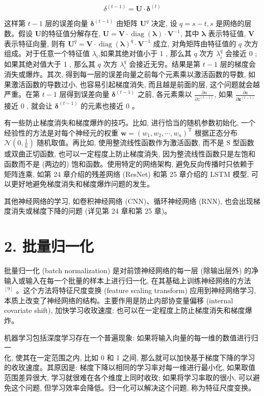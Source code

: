 \documentclass[10pt]{article}
\begin{document}
\begin{CJK*}{UTF8}{bsmi}
$$
\delta^{(t-1)}=\boldsymbol{U} \cdot \boldsymbol{\delta}^{(t)}
$$

这样第 $t-1$ 层的误差向量 $\boldsymbol{\delta}^{(t-1)}$ 由矩阵 $\boldsymbol{U}^{q}$ 决定, 设 $q=s-t, s$ 是网络的层数。假设 $\boldsymbol{U}$的特征值分解存在, $\boldsymbol{U}=\boldsymbol{V} \cdot \operatorname{diag}(\boldsymbol{\lambda}) \cdot \boldsymbol{V}^{-1}$, 其中 $\boldsymbol{\lambda}$ 表示特征值, $\boldsymbol{V}$ 表示特征向量, 则有 $\boldsymbol{U}^{q}=\boldsymbol{V} \cdot \operatorname{diag}(\boldsymbol{\lambda})^{q} \cdot \boldsymbol{V}^{-1}$ 成立, 对角矩阵由特征值的 $q$ 次方组成。对于任意一个特征值 $\lambda_{i}$,如果其绝对值小于 1 , 那么其 $q$ 次方 $\lambda_{i}^{q}$ 会接近 0 ; 如果其绝对值大于 1 , 那么其 $q$ 次方 $\lambda_{i}^{q}$ 会接近无穷。结果是第 $t-1$ 层的梯度会消失或爆炸。其次, 得到每一层的误差向量之前每个元素乘以激活函数的导数, 如果激活函数的导数过小, 也容易引起梯度消失, 而且越是前面的层, 这个问题就会越严重。在第 $t-1$ 层得到误差向量 $\boldsymbol{\delta}^{(t-1)}$ 之前, 各元素乘以 $\frac{\partial a}{\partial z^{(t-1)}}$, 如果 $\frac{\partial a}{\partial \boldsymbol{z}^{(t-1)}}$ 接近 0 , 就会让 $\boldsymbol{\delta}^{(t-1)}$ 的元素也接近 0 。

有一些防止梯度消失和梯度爆炸的技巧。比如, 进行恰当的随机参数初始化, 一个经验性的方法是对每个神经元的权重 $\boldsymbol{w}=\left(w_{1}, w_{2}, \cdots, w_{n}\right)^{\mathrm{T}}$ 根据正态分布 $\mathcal{N}\left(0, \frac{1}{n}\right)$ 随机取值。再比如, 使用整流线性函数作为激活函数, 而不是 $\mathrm{S}$ 型函数或双曲正切函数, 也可以一定程度上防止梯度消失, 因为整流线性函数只是左饱和函数而不是 (两边的) 饱和函数。使用特定的网络架构, 避免反向传播时只依赖于矩阵连乘, 如第 24 章介绍的残差网络 (ResNet) 和第 25 章介绍的 LSTM 模型, 可以更好地避免梯度消失和梯度爆炸问题的发生。

其他神经网络的学习, 如卷积神经网络 (CNN)、循环神经网络 (RNN), 也会出现梯度消失或梯度下降的问题 (详见第 24 章和第 25 章)。

\section*{2. 批量归一化}
批量归一化 (batch normalization) 是对前馈神经网络的每一层 (除输出层外) 的净输入或输入在每一个批量的样本上进行归一化, 在其基础上训练神经网络的方法 ${ }^{[9]}$ 。这个方法将特征尺度变换 (feature scaling transform) 应用到神经网络学习, 本质上改变了神经网络的结构。主要作用是防止内部协变量偏移 (internal covariate shift), 加快学习收玫速度; 也可以在一定程度上防止梯度消失和梯度爆炸。

机器学习包括深度学习存在一个普遍现象: 如果将输入向量的每一维的数值进行归一\\
化, 使其在一定范围之内, 比如 0 和 1 之间, 那么就可以加快基于梯度下降的学习的收玫速度。其原因是: 梯度下降以相同的学习率对每一维进行最小化, 如果取值范围差异很大, 学习就很难在各个维度上同时收玫; 如果将学习率取的很小, 可以避免这个问题, 但学习效率会降低。归一化可以解决这个问题, 称为特征尺度变换。


\end{CJK*}
\end{document}
